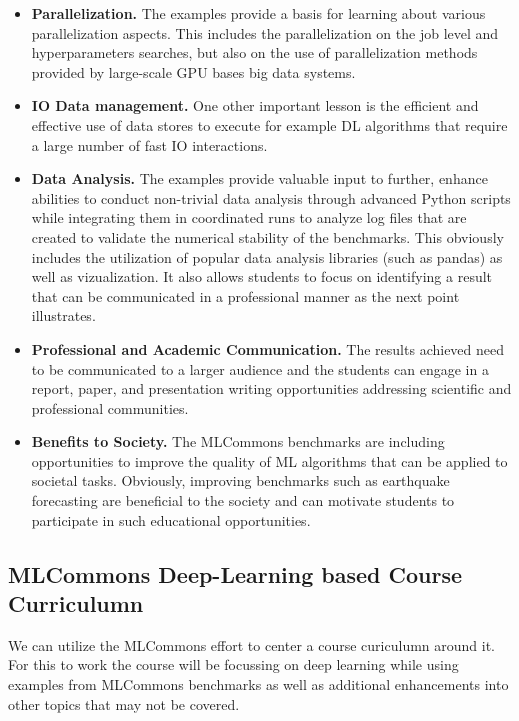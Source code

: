 \documentclass[utf8]{FrontiersinVancouver} %
\begin{document}
\begin{itemize}
  \item {\bf Parallelization.} The examples provide a basis for
    learning about various parallelization aspects. This includes the
    parallelization on the job level and hyperparameters searches, but
    also on the use of parallelization methods provided by large-scale
    GPU bases big data systems.

  \item {\bf IO Data management.} One other important lesson is the
    efficient and effective use of data stores to execute for example
    DL algorithms that require a large number of fast IO interactions.

  \item {\bf Data Analysis.} The examples provide valuable input to
    further, enhance abilities to conduct non-trivial data analysis
    through advanced Python scripts while integrating them in
    coordinated runs to analyze log files that are created to
    validate the numerical stability of the benchmarks. This obviously
    includes the utilization of popular data analysis libraries (such
    as pandas) as well as vizualization. It also allows students to
    focus on identifying a result that can be communicated in a
    professional manner as the next point illustrates.


  \item {\bf Professional and Academic Communication.} The results
    achieved need to be communicated to a larger audience and the
    students can engage in a report, paper, and
    presentation writing opportunities addressing scientific and
    professional communities.

  \item {\bf Benefits to Society.} The MLCommons benchmarks are
    including opportunities to improve the quality of ML algorithms
    that can be applied to societal tasks. Obviously, improving
    benchmarks such as earthquake forecasting are beneficial to the
    society and can motivate students to participate in such
    educational opportunities.

\end{itemize}


\subsection{MLCommons Deep-Learning based Course Curriculumn}

We can utilize the MLCommons effort to center a course curiculumn
around it. For this to work the course will be focussing on deep
learning while using examples from MLCommons benchmarks as well as
additional enhancements into other topics that may not be covered.
\end{document}

